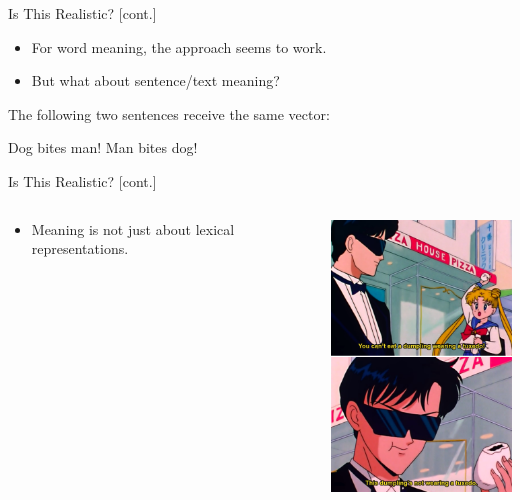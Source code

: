 \documentclass[professionalfonts, xcolor={usenames,svgnames,x11names,table}]{beamer}
\begin{document}
\begin{frame}{Is This Realistic? [cont.]}
    \begin{itemize}
        \item For word meaning, the approach seems to work.
        \item But what about sentence/text meaning?
    \end{itemize}
    \begin{example}
        The following two sentences receive the same vector:
        \begin{exe}
            \ex
            \begin{xlist}
                \ex Dog bites man!
                \ex Man bites dog!
            \end{xlist}
        \end{exe}
    \end{example}
\end{frame}

\begin{frame}{Is This Realistic? [cont.]}

\begin{columns}
\begin{column}{0.5\textwidth}
    \begin{itemize}
        \item Meaning is not just about lexical representations.
   \end{itemize}
   
   \vspace{0.5cm}
\end{column}
\begin{column}{0.5\textwidth}
\includegraphics[width=14em]{./img/ambiguity}
\end{column}
\end{columns}
\end{frame}
\end{document}
